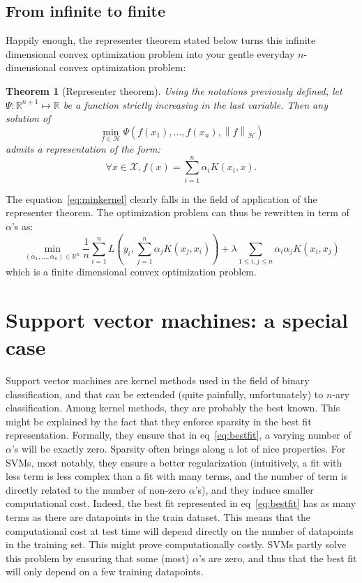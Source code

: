 \documentclass[a4paper, 11pt]{article}
\newtheorem{theorem}{Theorem}
\newcommand{\X}{\mathcal{X}}
\newcommand{\R}{\mathbb{R}}
\newcommand{\Hilb}{\mathcal{H}}
\newcommand{\x}{x_i}
\newcommand{\y}{y_i}
\newcommand{\normh}[1]{\left\| #1 \right\|_\Hilb}
\begin{document}
\subsection{From infinite to finite}
Happily enough, the representer theorem stated below turns this infinite dimensional convex optimization
problem into your gentle everyday $n$-dimensional convex optimization problem:
\begin{theorem}[Representer theorem]
  Using the notations previously defined, let $\Psi:\R^{n+1}\mapsto\R$ be a function strictly increasing in 
  the last variable. Then any solution of
  \begin{equation}
    \min\limits_{f\in\Hilb}\Psi(f(x_1), \dots, f(x_n), \normh{f})
  \end{equation}
  admits a representation of the form:
  \begin{equation}
    \forall x \in \X, f(x) = \sum\limits_{i=1}^n\alpha_iK(\x,x).
    \label{eq:bestfit}
  \end{equation}
\end{theorem}
The equation~\ref{eq:minkernel} clearly falls in the field of application of the representer theorem.
The optimization problem can thus be rewritten in term of $\alpha$'s as:
\begin{equation}
  \min\limits_{(\alpha_1, \dots, \alpha_n)\in\R^n} 
  \frac{1}{n}\sum\limits_{i=1}^nL(\y, \sum\limits_{j=1}^n\alpha_jK(x_j, x_i)) +
  \lambda\sum\limits_{1\leq i,j\leq n}\alpha_i\alpha_j K(\x, x_j)
\end{equation}
which is a finite dimensional convex optimization problem.

\section{Support vector machines: a special case}
Support vector machines are kernel methods used in the field of binary
classification, and that can be extended (quite painfully, unfortunately) to
$n$-ary classification.  Among kernel methods, they are probably the best
known.  This might be explained by the fact that they enforce sparsity in the
best fit representation. Formally, they ensure that in eq~\ref{eq:bestfit}, a
varying number of $\alpha$'s will be exactly zero.  Sparsity often brings along
a lot of nice properties. For SVMs, most notably, they ensure a better
regularization (intuitively, a fit with less term is less complex than a fit
with many terms, and the number of term is directly related to the number of
non-zero $\alpha$'s), and they induce smaller computational cost. Indeed, the
best fit represented in eq~\ref{eq:bestfit} has as many terms as there are
datapoints in the train dataset. This means that the computational cost at test
time will depend directly on the number of datapoints in the training set. This
might prove computationally costly. SVMs partly solve this problem by ensuring
that some (most) $\alpha$'s are zero, and thus that the best fit will only
depend on a few training datapoints. 
\end{document}
